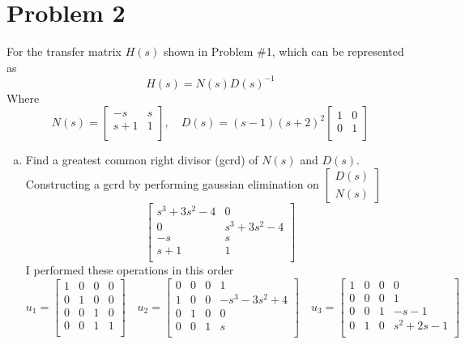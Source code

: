 \documentclass{article}
\begin{document}
\newpage
\section*{Problem 2}
For the transfer matrix $H(s)$ shown in Problem \#1, which can be represented as
$$ H(s) = N(s)D(s)^{-1} $$
Where
$$
N(s) =
\begin{bmatrix}
-s & s \\
s+1 & 1 \\
\end{bmatrix}
,\quad
D(s) =
(s-1)(s+2)^2
\begin{bmatrix}
1 & 0 \\
0 & 1 \\
\end{bmatrix}
$$
\begin{enumerate}[(a)]
\item Find a greatest common right divisor (gcrd) of $N(s)$ and $D(s)$.
\newline
Constructing a gcrd by performing gaussian elimination on $ \begin{bmatrix} D(s) \\ N(s) \end{bmatrix} $
$$
\begin{bmatrix}
s^3 + 3s^2 -4 & 0 \\
0 & s^3 + 3s^2 -4 \\
-s & s \\
s+1 & 1 \\
\end{bmatrix}
$$
I performed these operations in this order
$$
u_1 =
\begin{bmatrix}
1 & 0 & 0 & 0 \\
0 & 1 & 0 & 0 \\
0 & 0 & 1 & 0 \\
0 & 0 & 1 & 1 \\
\end{bmatrix}
\quad
u_2 =
\begin{bmatrix}
0 & 0 & 0 & 1 \\
1 & 0 & 0 & -s^3-3 s^2+4 \\
0 & 1 & 0 & 0 \\
0 & 0 & 1 & s \\
\end{bmatrix}
\quad
u_3 =
\begin{bmatrix}
1 & 0 & 0 & 0 \\
0 & 0 & 0 & 1 \\
0 & 0 & 1 & -s-1 \\
0 & 1 & 0 & s^2+2 s-1 \\

\end{bmatrix}$$
\end{enumerate}
\end{document}
